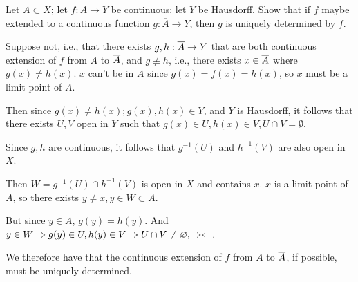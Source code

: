 \documentclass[a4paper, 12pt]{article}
\begin{document}
\begin{problem} 
Let $A \subset X$; let $f: A \to Y$ be continuous; let $Y$ be Hausdorff. Show that if $f$ maybe extended to a continuous function $g: \overline{A} \to Y$, then $g$ is uniquely determined by $f$.
\end{problem}
\begin{solution}
    Suppose not, i.e., that there exists $g, h: \overline{A} \to Y$ that are both continuous extension of $f$ from $A$ to $\overline{A}$, and $g \not \equiv h$, i.e., there exists $x \in \overline{A}$ where $g(x) \neq h(x)$. $x$ can't be in $A$ since $g(x) = f(x) = h(x)$, so $x$ must be a limit point of $A$.

    Then since $g(x) \neq h(x); g(x), h(x) \in Y$, and $Y$ is Hausdorff, it follows that there exists $U, V$ open in $Y$ such that $g(x) \in U, h(x) \in V, U \cap V = \emptyset$.

    Since $g, h$ are continuous, it follows that $g^{-1}(U)$ and $h^{-1}(V)$ are also open in $X$.

    Then $W = g^{-1}(U) \cap h^{-1}(V)$ is open in $X$ and contains $x$.  $x$ is a limit point of $A$, so there exists $y \neq x, y \in W \subset A$.

    But since $y \in A$, $g(y) = h(y)$. And $y \in W \Rightarrow g(y) \in U, h(y) \in V \Rightarrow U \cap V \neq \varnothing, \Rightarrow\Leftarrow$.

    We therefore have that the continuous extension of $f$ from $A$ to $\overline{A}$, if possible, must be uniquely determined.
\end{solution}
\end{document}
